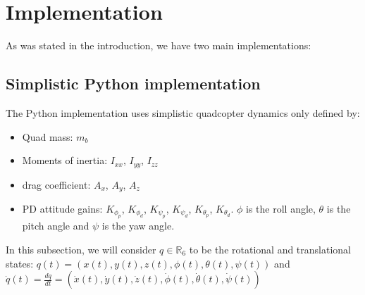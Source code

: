 \section{Implementation}
\label{Implementation section}
As was stated in the introduction, we have two main implementations: 
\subsection{Simplistic Python implementation}
The Python implementation uses simplistic quadcopter dynamics only defined by:
\begin{itemize}
    \item Quad mass: $m_b$
    \item Moments of inertia: $I_{xx}$, $I_{yy}$, $I_{zz}$
    \item drag coefficient: $A_{x}$, $A_{y}$, $A_{z}$
    \item PD attitude gains: $K_{\phi_{p}}$, $K_{\phi_{d}}$, $K_{\psi_{p}}$, $K_{\psi_{d}}$, $K_{\theta_{p}}$, $K_{\theta_{d}}$. $\phi$ is the roll angle, $\theta$ is the pitch angle and $\psi$ is the yaw angle.
\end{itemize}

In this subsection, we will consider $q\in\mathbb{R}_6$ to be the rotational and translational states: $q(t) = (x(t), y(t), z(t), \phi(t), \theta(t), \psi(t))$
and $\dot{q}(t) = \frac{dq}{dt} = (\dot{x}(t), \dot{y}(t), \dot{z}(t), \dot{\phi}(t), \dot{\theta}(t), \dot{\psi}(t))$

